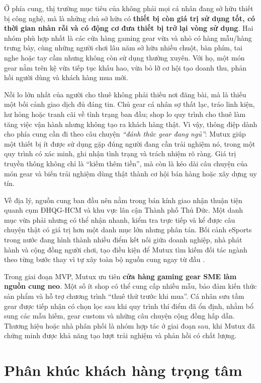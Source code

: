 Ở phía cung, thị trường mục tiêu của \projectname{} không phải mọi cá nhân đang sở hữu thiết bị công nghệ, mà là những chủ sở hữu có \textbf{thiết bị còn giá trị sử dụng tốt, có thời gian nhàn rỗi và có động cơ đưa thiết bị trở lại vòng sử dụng}. Hai nhóm phù hợp nhất là các cửa hàng gaming gear vừa và nhỏ có hàng mẫu/hàng trưng bày, cùng những người chơi lâu năm sở hữu nhiều chuột, bàn phím, tai nghe hoặc tay cầm nhưng không còn sử dụng thường xuyên. Với họ, một món gear nằm trên kệ vừa tiếp tục khấu hao, vừa bỏ lỡ cơ hội tạo doanh thu, phản hồi người dùng và khách hàng mua mới.

Nỗi lo lớn nhất của người cho thuê không phải thiếu nơi đăng bài, mà là thiếu một bối cảnh giao dịch đủ đáng tin. Chủ gear cá nhân sợ thất lạc, tráo linh kiện, hư hỏng hoặc tranh cãi về tình trạng ban đầu; shop lo quy trình cho thuê làm tăng việc vận hành nhưng không tạo ra khách hàng thật. Vì vậy, thông điệp dành cho phía cung cần đi theo câu chuyện \textit{``đánh thức gear đang ngủ''}: Mutux giúp một thiết bị ít được sử dụng gặp đúng người đang cần trải nghiệm nó, trong một quy trình có xác minh, ghi nhận tình trạng và trách nhiệm rõ ràng. Giá trị truyền thông không chỉ là ``kiếm thêm tiền'', mà còn là kéo dài câu chuyện của món gear và biến trải nghiệm dùng thật thành cơ hội bán hàng hoặc xây dựng uy tín.

Về địa lý, nguồn cung ban đầu nên nằm trong bán kính giao nhận thuận tiện quanh cụm ĐHQG-HCM và khu vực lân cận Thành phố Thủ Đức. Một danh mục vừa phải nhưng có thể nhận nhanh, kiểm tra trực tiếp và kể được câu chuyện thật có giá trị hơn một danh mục lớn nhưng phân tán. Bối cảnh eSports trong nước đang hình thành nhiều điểm kết nối giữa doanh nghiệp, nhà phát hành và cộng đồng người chơi, tạo điều kiện để Mutux tìm kiếm đối tác ngành theo từng bước thay vì tự xây toàn bộ nguồn cung ngay từ đầu \cite{baochinhphuGameverse2026}.

Trong giai đoạn MVP, Mutux ưu tiên \textbf{cửa hàng gaming gear SME làm nguồn cung neo}. Một số ít shop có thể cung cấp nhiều mẫu, bảo đảm kiến thức sản phẩm và hỗ trợ chương trình ``thuê thử trước khi mua''. Cá nhân sưu tầm gear được tiếp nhận có chọn lọc sau khi quy trình thí điểm đã ổn định, nhằm bổ sung các mẫu hiếm, gear custom và những câu chuyện cộng đồng hấp dẫn. Thương hiệu hoặc nhà phân phối là nhóm hợp tác ở giai đoạn sau, khi Mutux đã chứng minh được khả năng tạo lượt trải nghiệm và phản hồi có chất lượng.

\section{Phân khúc khách hàng trọng tâm}

